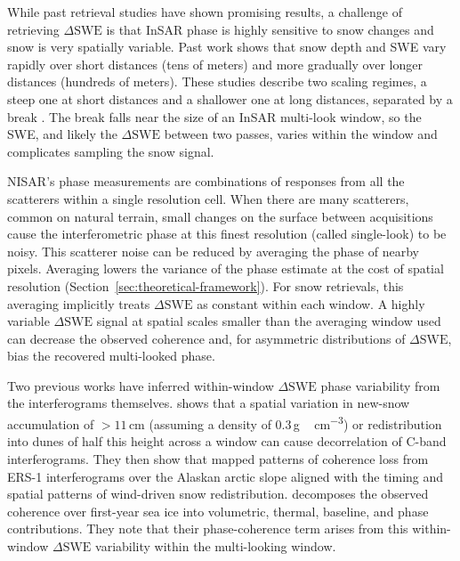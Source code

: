 \documentclass[tc, manuscript]{copernicus}
\begin{document}
While past retrieval studies have shown promising results, a challenge of retrieving $\Delta\mathrm{SWE}$ is that InSAR phase is highly sensitive to snow changes and snow is very spatially variable. Past work shows that snow depth and SWE vary rapidly over short distances (tens of meters) and more gradually over longer distances (hundreds of meters). These studies describe two scaling regimes, a steep one at short distances and a shallower one at long distances, separated by a break \citep{deems2006, trujillo2007topographic-0ec, Clark2011, mendoza2020, Miller2022}. The break falls near the size of an InSAR multi-look window, so the SWE, and likely the $\Delta\mathrm{SWE}$ between two passes, varies within the window and complicates sampling the snow signal.

NISAR's phase measurements are combinations of responses from all the scatterers within a single resolution cell. When there are many scatterers, common on natural terrain, small changes on the surface between acquisitions cause the interferometric phase at this finest resolution (called single-look) to be noisy. This scatterer noise can be reduced by averaging the phase of nearby pixels. Averaging lowers the variance of the phase estimate at the cost of spatial resolution (Section~\ref{sec:theoretical-framework}). For snow retrievals, this averaging implicitly treats $\Delta\mathrm{SWE}$ as constant within each window. A highly variable $\Delta\mathrm{SWE}$ signal at spatial scales smaller than the averaging window used can decrease the observed coherence and, for asymmetric distributions of $\Delta\mathrm{SWE}$, bias the recovered multi-looked phase.

Two previous works have inferred within-window $\Delta\mathrm{SWE}$ phase variability from the interferograms themselves. \citet{LiSturm2002} shows that a spatial variation in new-snow accumulation of $>11$\,\unit{cm} (assuming a density of 0.3\,\unit{g\,cm^{-3}}) or redistribution into dunes of half this height across a window can cause decorrelation of C-band interferograms. They then show that mapped patterns of coherence loss from ERS-1 interferograms over the Alaskan arctic slope aligned with the timing and spatial patterns of wind-driven snow redistribution. \citet{ming2026} decomposes the observed coherence over first-year sea ice into volumetric, thermal, baseline, and phase contributions. They note that their phase-coherence term arises from this within-window $\Delta\mathrm{SWE}$ variability within the multi-looking window.
\end{document}
